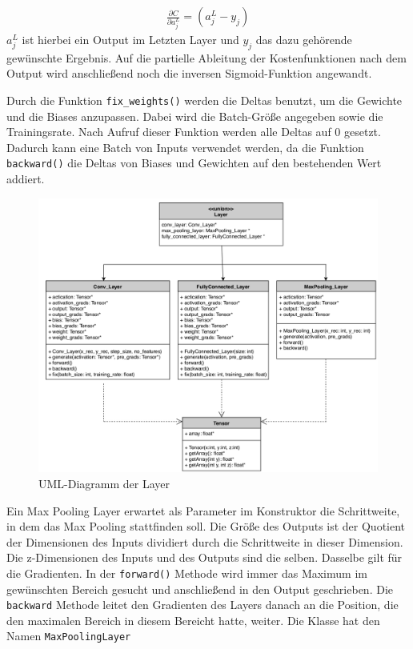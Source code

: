\documentclass[../main.tex]{subfiles}
\begin{document}
\begin{equation}\label{eq:fehler_in_letztem_layer}
\begin{split}
\frac{\partial C}{\partial a_j^L} = ( a_j^L - y_j )
\end{split}
\end{equation}
$a_j^L$ ist hierbei ein Output im Letzten Layer und $y_j$ das dazu gehörende gewünschte Ergebnis. Auf die partielle Ableitung der Kostenfunktionen nach dem Output wird anschließend noch die inversen Sigmoid-Funktion angewandt.

Durch die Funktion \texttt{fix\_weights()} werden die Deltas benutzt, um die Gewichte und die Biases anzupassen. Dabei wird die Batch-Größe angegeben sowie die Trainingsrate. Nach Aufruf dieser Funktion werden alle Deltas auf 0 gesetzt. Dadurch kann eine Batch von Inputs verwendet werden, da die Funktion \texttt{backward()} die Deltas von Biases und Gewichten auf den bestehenden Wert addiert.

\begin{figure}[!htbp]
	\centering
	\includegraphics[width=\textwidth]{../images/Benz/UML_Layer.png}
	\caption{UML-Diagramm der Layer} 
	\label{fig:uml_layer}
\end{figure}

Ein Max Pooling Layer erwartet als Parameter im Konstruktor die Schrittweite, in dem das Max Pooling stattfinden soll. Die Größe des Outputs ist der Quotient der Dimensionen des Inputs dividiert durch die Schrittweite in dieser Dimension. Die z-Dimensionen des Inputs und des Outputs sind die selben. Dasselbe gilt für die Gradienten. In der \texttt{forward()} Methode wird immer das Maximum im gewünschten Bereich gesucht und anschließend in den Output geschrieben. Die \texttt{backward} Methode leitet den Gradienten des Layers danach an die Position, die den maximalen Bereich in diesem Bereicht hatte, weiter. Die Klasse hat den Namen \texttt{MaxPoolingLayer}
\end{document}
